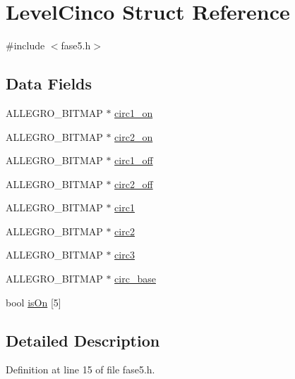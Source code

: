 \hypertarget{struct_level_cinco}{\section{Level\-Cinco Struct Reference}
\label{struct_level_cinco}
}


{\ttfamily \#include $<$fase5.\-h$>$}

\subsection*{Data Fields}
\begin{DoxyCompactItemize}
\item 
A\-L\-L\-E\-G\-R\-O\-\_\-\-B\-I\-T\-M\-A\-P $\ast$ \hyperlink{struct_level_cinco_a15699608afb18fad793848cd8fd32fe0}{circ1\-\_\-on}
\item 
A\-L\-L\-E\-G\-R\-O\-\_\-\-B\-I\-T\-M\-A\-P $\ast$ \hyperlink{struct_level_cinco_aa582b8f9acdbb85a2d1d54705e26fa15}{circ2\-\_\-on}
\item 
A\-L\-L\-E\-G\-R\-O\-\_\-\-B\-I\-T\-M\-A\-P $\ast$ \hyperlink{struct_level_cinco_a61973bafd11ab9dea9306731297f4728}{circ1\-\_\-off}
\item 
A\-L\-L\-E\-G\-R\-O\-\_\-\-B\-I\-T\-M\-A\-P $\ast$ \hyperlink{struct_level_cinco_a384448f3d672f70b70b1bf454cb46e50}{circ2\-\_\-off}
\item 
A\-L\-L\-E\-G\-R\-O\-\_\-\-B\-I\-T\-M\-A\-P $\ast$ \hyperlink{struct_level_cinco_a9877f31790b6d2f38fb468a9448223f1}{circ1}
\item 
A\-L\-L\-E\-G\-R\-O\-\_\-\-B\-I\-T\-M\-A\-P $\ast$ \hyperlink{struct_level_cinco_a1b8836cb8a00a286c87bfbafdacbd03d}{circ2}
\item 
A\-L\-L\-E\-G\-R\-O\-\_\-\-B\-I\-T\-M\-A\-P $\ast$ \hyperlink{struct_level_cinco_aaa21201ceebf455212233414bd6eedbc}{circ3}
\item 
A\-L\-L\-E\-G\-R\-O\-\_\-\-B\-I\-T\-M\-A\-P $\ast$ \hyperlink{struct_level_cinco_aee8957702842b3d636f0a1075b6e52e2}{circ\-\_\-base}
\item 
bool \hyperlink{struct_level_cinco_a59f6fe985ed5513f62660b2926c812aa}{is\-On} \mbox{[}5\mbox{]}
\end{DoxyCompactItemize}


\subsection{Detailed Description}


Definition at line 15 of file fase5.\-h.



